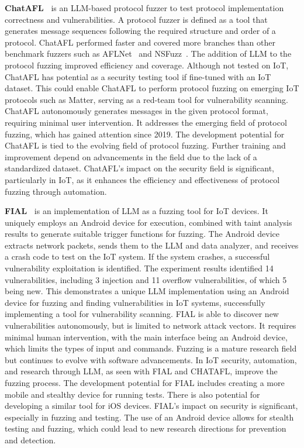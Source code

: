 \smallskip
\noindent \textbf{ChatAFL~\citet{meng2024large}} is an LLM-based protocol fuzzer to test protocol implementation correctness and vulnerabilities.
A protocol fuzzer is defined as a tool that generates message sequences following the required structure and order of a protocol.
ChatAFL performed faster and covered more branches than other benchmark fuzzers such as AFLNet~\citet{9159093} and NSFuzz~\citet{NSFuzz2023}.
The addition of LLM to the protocol fuzzing improved efficiency and coverage.
Although not tested on IoT, ChatAFL has potential as a security testing tool if fine-tuned with an IoT dataset.
This could enable ChatAFL to perform protocol fuzzing on emerging IoT protocols such as Matter, serving as a red-team tool for vulnerability scanning.
ChatAFL autonomously generates messages in the given protocol format, requiring minimal user intervention.
It addresses the emerging field of protocol fuzzing, which has gained attention since 2019.
The development potential for ChatAFL is tied to the evolving field of protocol fuzzing.
Further training and improvement depend on advancements in the field due to the lack of a standardized dataset.
ChatAFL's impact on the security field is significant, particularly in IoT, as it enhances the efficiency and effectiveness of protocol fuzzing through automation.

\smallskip
\noindent \textbf{FIAL~\citet{androidfuzz2024}} is an implementation of LLM as a fuzzing tool for IoT devices.
It uniquely employs an Android device for execution, combined with taint analysis results to generate suitable trigger functions for fuzzing.
The Android device extracts network packets, sends them to the LLM and data analyzer, and receives a crash code to test on the IoT system.
If the system crashes, a successful vulnerability exploitation is identified.
The experiment results identified 14 vulnerabilities, including 3 injection and 11 overflow vulnerabilities, of which 5 being new.
This demonstrates a unique LLM implementation using an Android device for fuzzing and finding vulnerabilities in IoT systems, successfully implementing a tool for vulnerability scanning.
FIAL is able to discover new vulnerabilities autonomously, but is limited to network attack vectors.
It requires minimal human intervention, with the main interface being an Android device, which limits the types of input and commands.
Fuzzing is a mature research field but continues to evolve with software advancements.
In IoT security, automation, and research through LLM, as seen with FIAL and CHATAFL, improve the fuzzing process.
The development potential for FIAL includes creating a more mobile and stealthy device for running tests.
There is also potential for developing a similar tool for iOS devices.
FIAL's impact on security is significant, especially in fuzzing and testing.
The use of an Android device allows for stealth testing and fuzzing, which could lead to new research directions for prevention and detection.

